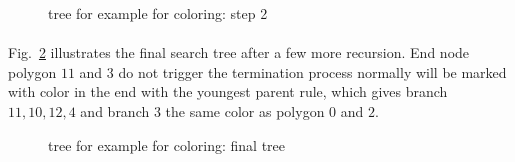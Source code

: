     \begin{figure}[h!]
        \centering
        \caption[Tree for example for coloring: step 2]{tree for example for coloring: step 2}
        \label{qdt_fig:qdt_color_tree_1}
    \end{figure}

\paragraph{}
Fig.~\ref{qdt_fig:qdt_color_tree_2} illustrates the final search tree after a few more recursion.
End node polygon $11$ and $3$ do not trigger the termination process normally will be marked with color in the end with the youngest parent rule, which gives branch $11,10,12,4$ and branch $3$ the same color as polygon $0$ and $2$.

    \begin{figure}[h!]
        \centering
        \caption[Tree for example for coloring: final tree]{tree for example for coloring: final tree}
        \label{qdt_fig:qdt_color_tree_2}
    \end{figure}

\pagebreak